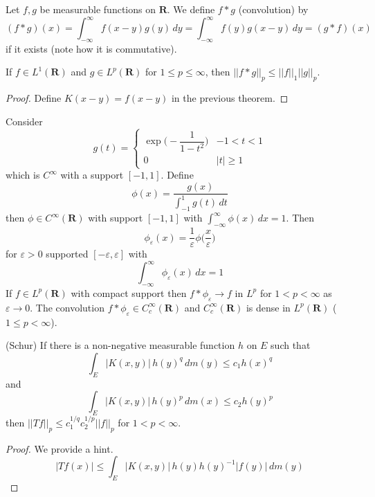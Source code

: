 \vspace{2ex}
\begin{defi}
Let $f,g$ be measurable functions on ${\bm R}$. We define $f*g$ (convolution) by 
\[(f*g)(x)=\int ^{\infty }_{-\infty }f(x-y)g(y)\,d y=\int ^{\infty }_{-\infty }f(y)g(x-y)\,d y=(g*f)(x)\]
if it exists (note how it is commutative). 
\end{defi}
\vspace{2ex}
\begin{thm}
If $f\in L^{1}({\bm R})$ and $g\in L^{p}({\bm R})$ for $1\leq p\leq \infty $, then $||f*g||_{p}\leq ||f||_{1}||g||_{p}$.
\end{thm}
\vspace{2ex}
\begin{proof}
Define $K(x-y)=f(x-y)$ in the previous theorem. 
\end{proof}
\vspace{2ex}
\begin{rmk}
Consider
\[g(t)=\begin{cases}
\exp \Big(-\dfrac{1}{1-t^2}\Big)&-1<t<1\\
0&|t|\geq 1
\end{cases}\]
which is $C^{\infty }$ with a support $[-1,1]$. Define
\[\phi (x)=\dfrac{g(x)}{\int ^{1}_{-1}g(t)\,dt }\]
then $\phi \in C^{\infty }({\bm R})$ with support $[-1,1]$ with $\int ^{\infty }_{-\infty }\phi (x)\,d x=1$. Then
\[\phi _{\varepsilon }(x)=\dfrac{1}{\varepsilon }\phi \Big(\dfrac{x}{\varepsilon }\Big)\]
for $\varepsilon >0$ supported $[-\varepsilon ,\varepsilon ]$ with
\[\int ^{\infty }_{-\infty }\phi _{\varepsilon }(x)\,dx=1\]
If $f\in L^{p}({\bm R})$ with compact support then $f*\phi _{\varepsilon }\rightarrow f$ in $L^{p} $ for $1<p<\infty $ as $\varepsilon \rightarrow 0$. The convolution $f*\phi _{\varepsilon }\in C^{\infty }_{c}({\bm R})$ and $C^{\infty }_{c}({\bm R})$ is dense in $L^{p}({\bm R})$ ($1\leq p<\infty $).
\end{rmk}
\vspace{2ex}
\begin{thm}
(Schur) If there is a non-negative measurable function $h$ on $E$ such that 
\[\int _{E}|K(x,y)|\,h(y)^{q}\,d m(y)\leq c_1h(x)^{q}\]
and
\[\int _{E}|K(x,y)|\,h(y)^{p}\,d m(x)\leq c_2h(y)^{p}\]
then $||Tf||_{p}\leq c_1^{1/q}c_2^{1/p}||f||_{p}$ for $1<p<\infty $. 
\end{thm}
\vspace{2ex}
\begin{proof}
We provide a hint. 
\[|Tf(x)|\leq \int _{E}|K(x,y)|\,h(y)h(y)^{-1}|f(y)|\,d m(y)\]
\end{proof}

